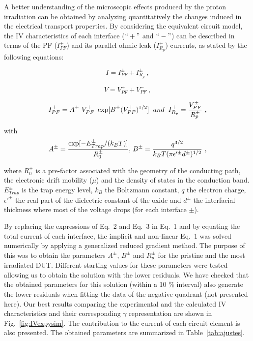 \documentclass[square,aip,preprint,showkeys,superscriptaddress]{revtex4}
\begin{document}
A better understanding of the microscopic effects produced by the proton irradiation can be obtained by analyzing quantitatively the changes induced in the electrical transport properties. By considering the equivalent circuit model, the IV characteristics of each interface ($``+"$ and $``-"$) can be described in terms of the PF ($I_{PF}^{\pm}$) and its parallel ohmic leak ($I_{R_p}^{\pm}$) currents, as stated  by the following equations:


\begin{equation}
\label{eq:I1} 
I =  I_{PF}^{\pm} + I_{R_p}^{\pm}~, 
\end{equation}


\begin{equation}
\label{eq:V} 
V = V_{PF}^{+} +  V_{PF}^{-} ~,
\end{equation}



\begin{equation}
\label{eq:PF} 
I_{PF}^{\pm} = A^{\pm}~V_{PF}^{\pm} ~ \exp[B^{\pm}
(V_{PF}^{\pm})^{1/2}]  \hspace{2mm} {\normalfont{and}} \hspace{2mm} I_{R_p}^{\pm} = \frac{V_{PF}^{\pm}}{R_p^{\pm}}~,
\end{equation}

\noindent with
\begin{equation}
\label{eq:AyB}
A^{\pm}=\frac{\exp[-E_{Trap}^{\pm}/(k_B T)]}{R_0^{\pm}} , \hspace{0.5mm}  B^{\pm} = \frac{q^{3/2}}{k_B T (\pi \epsilon'^{\pm} d^{\pm})^{1/2}}~,
\end{equation}

\noindent where $R_0^{\pm}$ is a pre-factor associated with the geometry of the conducting path, the
electronic drift mobility ($\mu$) and the density of states in the
conduction band. $E_{Trap}^{\pm}$ is the trap energy level, $k_B$ the Boltzmann
constant, $q$ the electron charge, $\epsilon'^{\pm}$ the real part of the dielectric constant of the oxide and $d^{\pm}$ the interfacial thickness where most of the voltage drops (for each interface ${\pm}$). 

By replacing the expressions of Eq.~2 and Eq.~3 in Eq.~1 and by equating the total current of each interface, the implicit and non-linear Eq.~1 was solved numerically by applying a generalized reduced gradient method. The purpose of this was to obtain the parameters $A^{\pm}$, $B^{\pm}$ and $R_p^{\pm}$ for the pristine and the most irradiated DUT. Different starting values for these parameters were tested allowing us to obtain the solution with the lower residuals. We have checked that the obtained parameters for this solution (within a 10 \% interval) also generate the lower residuals when fitting the data of the negative quadrant (not presented here).
Our best results comparing the experimental and the calculated IV characteristics and their corresponding $\gamma$ representation are shown in Fig.~\ref{fig:IVexpysim}. The contribution to the current of each circuit element is also presented. The obtained parameters are summarized in Table~\ref{tab:ajustes}.
\end{document}
